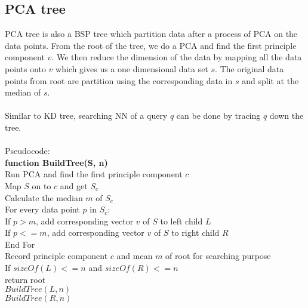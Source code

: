 \documentclass[paper=letter, fontsize=12pt]{article} %
\begin{document}
\subsection{PCA tree}
PCA tree is also a BSP tree which partition data after a process of PCA on the data points. From the root of the tree, we do a PCA and find the first principle component $v$. We then reduce the dimension of the data by mapping all the data points onto $v$ which gives us a one dimensional data set $s$. The original data points from root are partition using the corresponding data in $s$ and split at the median of $s$.
\\~\\
Similar to KD tree, searching NN of a query $q$ can be done by tracing $q$ down the tree.
\\~\\
Pseudocode:\\
\hspace*{1em} \textbf{function BuildTree(S, n)}\\
\hspace*{2em} Run PCA and find the first principle component $c$\\
\hspace*{2em} Map $S$ on to $c$ and get $S_c$\\
\hspace*{2em} Calculate the median $m$ of $S_c$\\
\hspace*{2em} For every data point $p$ in $S_c$:\\
\hspace*{3em} If $p > m$, add corresponding vector $v$ of $S$ to left child $L$\\
\hspace*{3em} If $p <= m$, add corresponding vector $v$ of $S$ to right child $R$\\
\hspace*{2em} End For\\
\hspace*{2em} Record principle component $c$ and mean $m$ of root for searching purpose\\
\hspace*{2em} If $sizeOf(L)<=n$ and $sizeOf(R) <=n$\\
\hspace*{3em} return root\\
\hspace*{2em} $BuildTree(L, n)$\\
\hspace*{2em} $BuildTree(R, n)$\\
\end{document}
